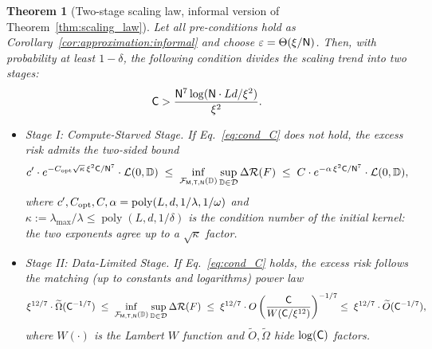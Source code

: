 \documentclass[11pt]{article}
\theoremstyle{plain}
\newtheorem{theorem}{Theorem}[section]
\newcommand{\wt}{\widetilde}
\DeclareMathOperator{\poly}{poly}
\begin{document}
\begin{theorem}[Two-stage scaling law, informal version of Theorem~\ref{thm:scaling_law}]\label{thm:scaling_law:informal}
    Let all pre-conditions hold as Corollary~\ref{cor:approximation:informal} and choose $\varepsilon = \Theta(\xi/{\sf N})$. Then, with probability at least $1-\delta$, the following condition divides the scaling trend into two stages:
    \begin{align}\label{eq:cond_C}
        {\sf C} > \frac{{\sf N}^7\log({\sf N}\cdot Ld/\xi^2)}{\xi^2}.
    \end{align}
    \begin{itemize}
        \item {\it Stage I: Compute-Starved Stage.} If Eq.~\eqref{eq:cond_C} does not hold, the excess risk admits the two-sided bound
        \begin{align*}
            c'\cdot e^{-C_{\rm opt}\sqrt{\kappa}\,\xi^2{\sf C}/{\sf N}^7}\cdot{\cal L}(0,\mathbb{D})\;\le\;\inf_{{\cal F}_{\sf M, T, N}(\mathbb{D})}\sup_{\mathbb{D}\in{\cal D}}\Delta{\cal R}(F)\;\le\;C\cdot e^{-\alpha\,\xi^2{\sf C}/{\sf N}^7}\cdot{\cal L}(0,\mathbb{D}),
        \end{align*}
        where $c', C_{\rm opt}, C, \alpha = \poly(L,d,1/\lambda,1/\omega)$ and $\kappa:=\lambda_{\max}/\lambda\le\poly(L,d,1/\delta)$ is the condition number of the initial kernel: the two exponents agree up to a $\sqrt{\kappa}$ factor.
        \item {\it Stage II: Data-Limited Stage.} If Eq.~\eqref{eq:cond_C} holds, the excess risk follows the matching (up to constants and logarithms) power law
        \begin{align*}
            \xi^{12/7}\cdot\wt{\Omega}({\sf C}^{-1/7})\;\le\;\inf_{{\cal F}_{\sf M, T, N}(\mathbb{D})}\sup_{\mathbb{D}\in{\cal D}}\Delta{\cal R}(F)\;\le\;\xi^{12/7}\cdot O\left(\frac{{\sf C}}{W({\sf C}/\xi^{12})}\right)^{-1/7}\le\;\xi^{12/7}\cdot\wt{O}({\sf C}^{-1/7}),
        \end{align*}
        where $W(\cdot)$ is the Lambert $W$ function and $\wt{O}, \wt{\Omega}$ hide $\log({\sf C})$ factors.
    \end{itemize}
\end{theorem}
\end{document}
